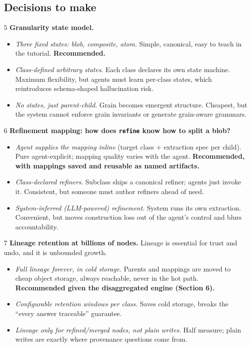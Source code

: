 \documentclass[11pt]{article}
\begin{document}
\subsection{Decisions to make}

\begin{decisionbox}{5}
\textbf{Granularity state model.}
\begin{itemize}[leftmargin=1.4em,itemsep=1pt]
  \item[A.] \emph{Three fixed states: blob, composite, atom.} Simple, canonical, easy to teach in the tutorial. \textbf{Recommended.}
  \item[B.] \emph{Class-defined arbitrary states.} Each class declares its own state machine. Maximum flexibility, but agents must learn per-class states, which reintroduces schema-shaped hallucination risk.
  \item[C.] \emph{No states, just parent-child.} Grain becomes emergent structure. Cheapest, but the system cannot enforce grain invariants or generate grain-aware grammars.
\end{itemize}
\end{decisionbox}

\begin{decisionbox}{6}
\textbf{Refinement mapping: how does \texttt{refine} know how to split a blob?}
\begin{itemize}[leftmargin=1.4em,itemsep=1pt]
  \item[A.] \emph{Agent supplies the mapping inline} (target class + extraction spec per child). Pure agent-explicit; mapping quality varies with the agent. \textbf{Recommended, with mappings saved and reusable as named artifacts.}
  \item[B.] \emph{Class-declared refiners.} Subclass ships a canonical refiner; agents just invoke it. Consistent, but someone must author refiners ahead of need.
  \item[C.] \emph{System-inferred (LLM-powered) refinement.} System runs its own extraction. Convenient, but moves construction loss out of the agent's control and blurs accountability.
\end{itemize}
\end{decisionbox}

\begin{decisionbox}{7}
\textbf{Lineage retention at billions of nodes.} Lineage is essential for trust and undo, and it is unbounded growth.
\begin{itemize}[leftmargin=1.4em,itemsep=1pt]
  \item[A.] \emph{Full lineage forever, in cold storage.} Parents and mappings are moved to cheap object storage, always reachable, never in the hot path. \textbf{Recommended given the disaggregated engine (Section 6).}
  \item[B.] \emph{Configurable retention windows per class.} Saves cold storage, breaks the ``every answer traceable'' guarantee.
  \item[C.] \emph{Lineage only for refined/merged nodes, not plain writes.} Half measure; plain writes are exactly where provenance questions come from.
\end{itemize}
\end{decisionbox}
\end{document}
